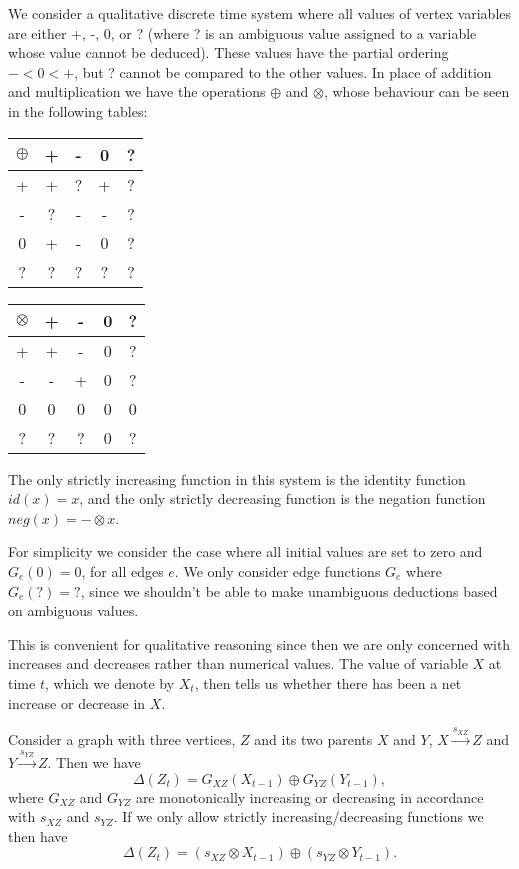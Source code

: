 We consider a qualitative discrete time system where all values of
vertex variables are either +, -, 0, or ? (where ? is an ambiguous
value assigned to a variable whose value cannot be deduced).
%
These values have the partial ordering $- < 0 < +$, but ? cannot be
compared to the other values.
%
In place of addition and multiplication we have the operations
$\oplus$ and $\otimes$, whose behaviour can be seen in the following
tables:
\begin{center}
\begin{tabular}{c|cccc}
$\oplus$ & + & - & 0 & ?\\
\hline
  +   & +  & ? & + & ?\\
  -   & ?  & - & - & ?\\
  0   & +  & - & 0 & ?\\
  ?   & ?  & ? & ? & ?\\
\end{tabular}
\quad
\begin{tabular}{c|cccc}
$\otimes$ & + & - & 0 & ?\\
\hline
  +   & +  & - & 0 & ?\\
  -   & -  & + & 0 & ?\\
  0   & 0  & 0 & 0 & 0\\
  ?   & ?  & ? & 0 & ?\\
\end{tabular}
\end{center}
The only strictly increasing function in this system is the identity
function $id(x) = x$, and the only strictly decreasing function is the
negation function $neg(x) =-\otimes x$.

For simplicity we consider the case where all initial values are set
to zero and $G_e(0)=0$, for all edges $e$.
%
We only consider edge functions $G_e$ where $G_e(?) = ?$, since we
shouldn't be able to make unambiguous deductions based on ambiguous
values.
%

This is convenient for qualitative reasoning since then we are only
concerned with increases and decreases rather than numerical values.
%
The value of variable $X$ at time $t$, which we denote by $X_t$, then
tells us whether there has been a net increase or decrease in $X$.

Consider a graph with three vertices, $Z$ and its two parents $X$ and
$Y$, $X\xrightarrow{s_{XZ}} Z$ and $Y\xrightarrow{s_{YZ}} Z$.
%
Then we have
%
\[\Delta(Z_t) = G_{XZ}(X_{t-1}) \oplus G_{YZ}(Y_{t-1}),\]
%
where $G_{XZ}$ and $G_{YZ}$ are monotonically increasing or decreasing
in accordance with $s_{XZ}$ and $s_{YZ}$.
%
If we only allow strictly increasing/decreasing functions we then have
%
\[\Delta(Z_t) = (s_{XZ}\otimes X_{t-1})\oplus (s_{YZ}\otimes Y_{t-1}).\]

